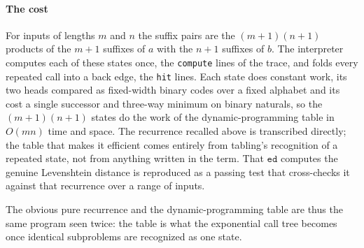 \paragraph{The cost}
For inputs of lengths $m$ and $n$ the suffix pairs are the $(m{+}1)(n{+}1)$ products of the $m{+}1$ suffixes of $a$ with the $n{+}1$ suffixes of $b$. The interpreter computes each of these states once, the \texttt{compute} lines of the trace, and folds every repeated call into a back edge, the \texttt{hit} lines. Each state does constant work, its two heads compared as fixed-width binary codes over a fixed alphabet and its cost a single successor and three-way minimum on binary naturals, so the $(m{+}1)(n{+}1)$ states do the work of the dynamic-programming table in $O(mn)$ time and space. The recurrence recalled above is transcribed directly; the table that makes it efficient comes entirely from tabling's recognition of a repeated state, not from anything written in the term. That $\mathtt{ed}$ computes the genuine Levenshtein distance is reproduced as a passing test that cross-checks it against that recurrence over a range of inputs.

The obvious pure recurrence and the dynamic-programming table are thus the same program seen twice: the table is what the exponential call tree becomes once identical subproblems are recognized as one state.

